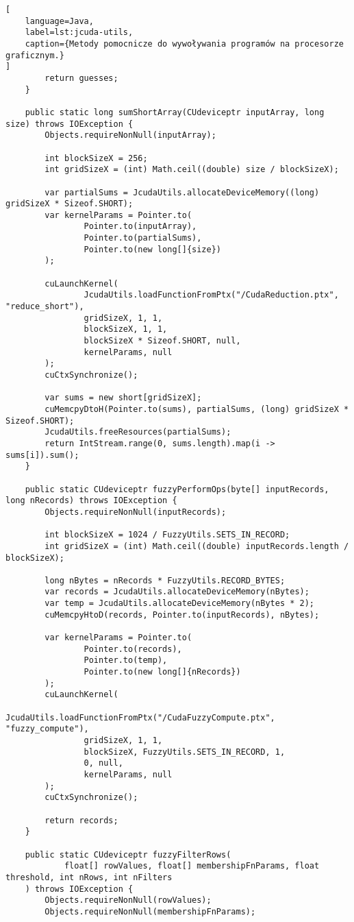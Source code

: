 \begin{lstlisting}[
    language=Java,
    label=lst:jcuda-utils,
    caption={Metody pomocnicze do wywoływania programów na procesorze graficznym.}
]
        return guesses;
    }

    public static long sumShortArray(CUdeviceptr inputArray, long size) throws IOException {
        Objects.requireNonNull(inputArray);

        int blockSizeX = 256;
        int gridSizeX = (int) Math.ceil((double) size / blockSizeX);

        var partialSums = JcudaUtils.allocateDeviceMemory((long) gridSizeX * Sizeof.SHORT);
        var kernelParams = Pointer.to(
                Pointer.to(inputArray),
                Pointer.to(partialSums),
                Pointer.to(new long[]{size})
        );

        cuLaunchKernel(
                JcudaUtils.loadFunctionFromPtx("/CudaReduction.ptx", "reduce_short"),
                gridSizeX, 1, 1,
                blockSizeX, 1, 1,
                blockSizeX * Sizeof.SHORT, null,
                kernelParams, null
        );
        cuCtxSynchronize();

        var sums = new short[gridSizeX];
        cuMemcpyDtoH(Pointer.to(sums), partialSums, (long) gridSizeX * Sizeof.SHORT);
        JcudaUtils.freeResources(partialSums);
        return IntStream.range(0, sums.length).map(i -> sums[i]).sum();
    }

    public static CUdeviceptr fuzzyPerformOps(byte[] inputRecords, long nRecords) throws IOException {
        Objects.requireNonNull(inputRecords);

        int blockSizeX = 1024 / FuzzyUtils.SETS_IN_RECORD;
        int gridSizeX = (int) Math.ceil((double) inputRecords.length / blockSizeX);

        long nBytes = nRecords * FuzzyUtils.RECORD_BYTES;
        var records = JcudaUtils.allocateDeviceMemory(nBytes);
        var temp = JcudaUtils.allocateDeviceMemory(nBytes * 2);
        cuMemcpyHtoD(records, Pointer.to(inputRecords), nBytes);

        var kernelParams = Pointer.to(
                Pointer.to(records),
                Pointer.to(temp),
                Pointer.to(new long[]{nRecords})
        );
        cuLaunchKernel(
                JcudaUtils.loadFunctionFromPtx("/CudaFuzzyCompute.ptx", "fuzzy_compute"),
                gridSizeX, 1, 1,
                blockSizeX, FuzzyUtils.SETS_IN_RECORD, 1,
                0, null,
                kernelParams, null
        );
        cuCtxSynchronize();

        return records;
    }

    public static CUdeviceptr fuzzyFilterRows(
            float[] rowValues, float[] membershipFnParams, float threshold, int nRows, int nFilters
    ) throws IOException {
        Objects.requireNonNull(rowValues);
        Objects.requireNonNull(membershipFnParams);


\end{lstlisting}
